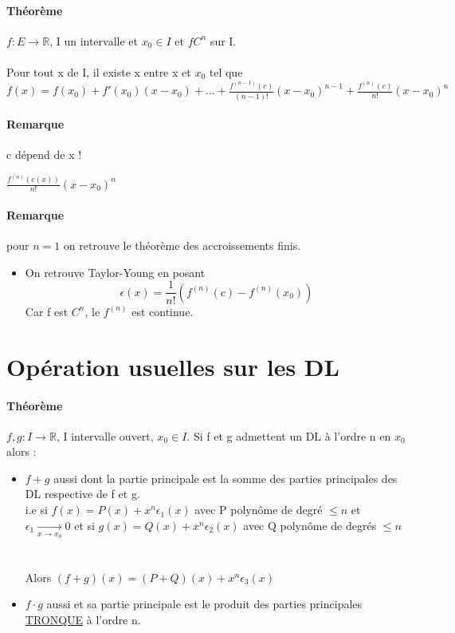 	\paragraph{Théorème} $f:E \rightarrow \mathbb{R}$, I un intervalle et $x_0 \in I$ et $f C^n$ sur I.
	\paragraph{} Pour tout x de I, il existe x entre x et $x_0$ tel que $f(x) = f(x_0)+f'(x_0)(x-x_0)+...+\frac{f^{(n-1)}(c)}{(n-1)!}(x-x_0)^{n-1} + \frac{f^{(n)}(c)}{n!}(x-x_0)^n$
	\paragraph{Remarque} c dépend de x !

	$\frac{f^{(n)}(c(x))}{n!}(x-x_0)^n$
	\paragraph{Remarque} pour $n=1$ on retrouve le théorème des accroissements finis.

	\begin{itemize}
		\item On retrouve Taylor-Young en posant \[\epsilon (x) = \frac{1}{n!}(f^{(n)}(c)-f^{(n)}(x_0)) \]
			Car f est $C^n$, le $f^{(n)}$ est continue.
	\end{itemize}

	\section{Opération usuelles sur les DL}

	\paragraph{Théorème} $f,g : I \rightarrow \mathbb{R}$, I intervalle ouvert, $x_0 \in I$.
	Si f et g admettent un DL à l'ordre n en $x_0$ alors :
	\begin{itemize}
		\item $f+g$ aussi dont la partie principale est la somme des parties principales des DL respective de f et g. ~\\
			i.e si $f(x) = P(x) + x^n\epsilon_1(x)$ avec P polynôme de degré $\leq n$ et $\epsilon_1 \xrightarrow[x \to x_0]{} 0$ et si $g(x) = Q(x) + x^n\epsilon_2(x)$ avec Q polynôme de degrés $\leq n$ ~\\ ~\\
			Alors $(f+g)(x) = (P+Q)(x) + x^n\epsilon_3(x)$
		\item $f \cdot g$ aussi et sa partie principale est le produit des parties principales \ul{TRONQUE} à l'ordre n.
	\end{itemize}

